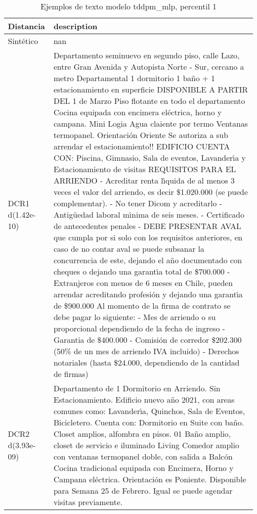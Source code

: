 \begin{table}[H]
\centering
\fontsize{10}{14}\selectfont
\caption{Ejemplos de texto modelo tddpm\_mlp, percentil 1}
\label{table-example-economicos-a-2-tddpm_mlp-1p-text}
\begin{tabular}{|l|m{35em}|}
\hline
\rowcolor[gray]{0.8}
Distancia & description \\
\hline Sintético & nan \\
\hline DCR1 d(1.42e-10) & Departamento seminuevo en segundo piso, calle Lazo, entre Gran Avenida y Autopista Norte - Sur, cercano a metro Departamental 1 dormitorio 1 ba\~no + 1 estacionamiento en superficie DISPONIBLE A PARTIR DEL 1 de Marzo Piso flotante en todo el departamento Cocina equipada con encimera el\'ectrica, horno y campana. Mini Logia Agua claiente por termo Ventanas termopanel. Orientaci\'on Oriente Se autoriza a sub arrendar el estacionamiento!!  EDIFICIO CUENTA CON:  Piscina, Gimnasio, Sala de eventos, Lavander{\'\i}a y Estacionamiento de visitas  REQUISITOS PARA EL ARRIENDO - Acreditar renta l{\'\i}quida de al menos 3 veces el valor del arriendo, es decir \$1.020.000 (se puede complementar). - No tener Dicom y acreditarlo  - Antig\"uedad laboral m{\'\i}nima de seis meses. - Certificado de antecedentes penales  - DEBE PRESENTAR AVAL que cumpla por si solo con los requisitos anteriores, en caso de no contar aval se puede subsanar la concurrencia de este, dejando el a\~no documentado con cheques o dejando una garant{\'\i}a total de \$700.000  -Extranjeros con menos de 6 meses en Chile, pueden arrendar acreditando profesi\'on y dejando una garant{\'\i}a de \$900.000  Al momento de la firma de contrato se debe pagar lo siguiente:  - Mes de arriendo o su proporcional dependiendo de la fecha de ingreso  - Garantia de \$400.000 - Comisi\'on de corredor \$202.300 (50\% de un mes de arriendo IVA incluido) - Derechos notariales (hasta \$24.000, dependiendo de la cantidad de firmas) \\
\hline DCR2 d(3.93e-09) & Departamento de 1 Dormitorio en Arriendo. Sin Estacionamiento.  Edificio nuevo a\~no 2021, con areas comunes como: Lavander{\'\i}a, Quinchos, Sala de Eventos, Bicicletero.
  Cuenta con:  Dormitorio en Suite con ba\~no. Closet amplios, alfombra en pisos.  01 Ba\~no amplio, closet de servicio e iluminado  Living Comedor amplio con ventanas termopanel doble, con salida a Balc\'on Cocina tradicional equipada con Encimera, Horno y Campana el\'ectrica.  Orientaci\'on es Poniente.   Disponible para Semana 25 de Febrero. Igual se puede agendar visitas previamente. \\
\hline
\end{tabular}
\end{table}
